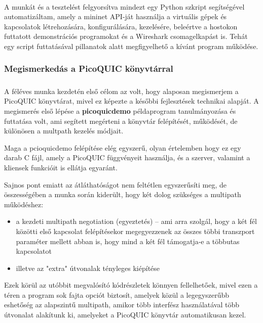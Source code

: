 \documentclass[a4paper,oneside]{article}
\begin{document}
\paragraph{}
A munkát és a tesztelést felgyorsítva mindezt egy Python szkript segítségével automatizáltam, 
amely a mininet API-ját használja a virtuális gépek és kapcsolatok létrehozására, konfigurálására, kezelésére, beleértve
a hostokon futtatott demonstrációs programokat és a Wireshark csomagelkapást is.
Tehát egy script futtatásával pillanatok alatt megfigyelhető a kívánt program működése.

\subsubsection{Megismerkedás a PicoQUIC könyvtárral}

\subparagraph{}
A féléves munka kezdetén első célom az volt, 
hogy alaposan megismerjem a PicoQUIC könyvtárat, mivel ez képezte a későbbi 
fejlesztések technikai alapját. A megismerés első lépése a \textbf{picoquicdemo} példaprogram
tanulmányozása és futtatása volt, ami segített megérteni a könyvtár felépítését, 
működését, de különösen a multpath kezelés módjait.

Maga a pcioquicdemo felépítése elég egyszerű, olyan értelemben hogy ez egy darab C fájl, amely a PicoQUIC függvényeit használja, 
és a szerver, valamint a kliensek funkcióit is ellátja egyaránt. 

Sajnos pont emiatt az átláthatóságot nem feltétlen egyszerűsíti meg, de összességében 
a munka során kiderült, hogy két dolog szükséges a multipath működéshez:

\begin{itemize}

  \item a kezdeti multipath negotiation (egyeztetés) – ami arra szolgál, hogy a két fél közötti első
  kapcsolat felépítésekor megegyezzenek az összes többi transzport paraméter mellett abban is, 
  hogy mind a két fél támogatja-e a többutas kapcsolatot

  \item illetve az "extra" útvonalak tényleges kiépítése

\end{itemize}

Ezek körül az utóbbit megvalósító kódrészletek könnyen fellelhetőek, mivel ezen a téren a program sok fajta opciót biztosít, 
amelyek közül a legegyszerűbb eshetőség az alapszintű multipath, amikor több interfész használatával
több útvonalat alakítunk ki, amelyeket a PicoQUIC könyvtár automatikusan kezel.
\end{document}
